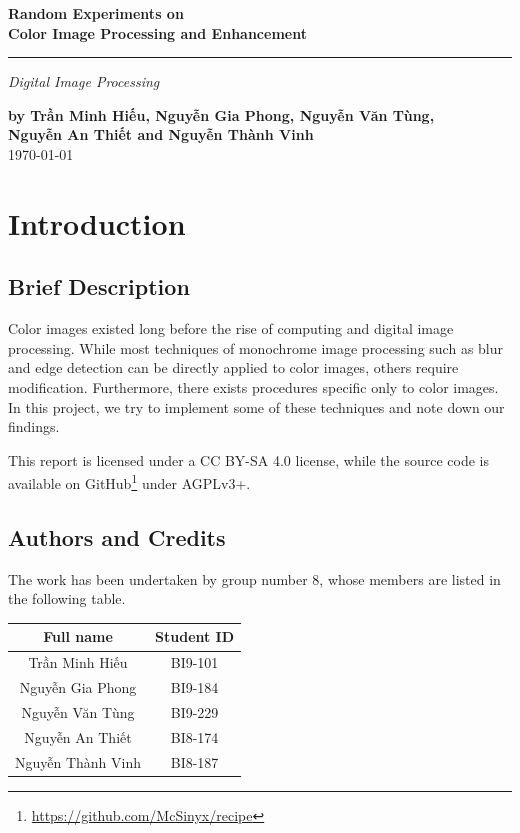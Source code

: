 \documentclass[a4paper,12pt]{article}
\begin{document}
\setcounter{page}{0}
\thispagestyle{empty}
\begin{flushright}
  \setlength{\baselineskip}{1.4\baselineskip}
\textbf{\Large Random Experiments on\\
        Color Image Processing and Enhancement}
  \noindent\rule{\textwidth}{3pt}
  \emph{\Large Digital Image Processing}

  \textbf{by Trần Minh Hiếu, Nguyễn Gia Phong, Nguyễn Văn Tùng,\\
          Nguyễn An Thiết and Nguyễn Thành Vinh\\}
  \today
\end{flushright}
\pagebreak

\tableofcontents
\pagebreak

\section{Introduction}
\subsection{Brief Description}
Color images existed long before the rise of computing and digital image
processing.  While most techniques of monochrome image processing such as
blur and edge detection can be directly applied to color images, others
require modification.  Furthermore, there exists procedures specific only
to color images.  In this project, we try to implement some of these
techniques and note down our findings.

This report is licensed under a CC BY-SA 4.0 license, while the source code
is available on GitHub\footnote{\url{https://github.com/McSinyx/recipe}}
under AGPLv3+.

\subsection{Authors and Credits}
The work has been undertaken by group number 8, whose members are listed
in the following table.
\begin{center}
  \begin{tabular}{c c}
    \toprule
    Full name & Student ID\\
    \midrule
    Trần Minh Hiếu & BI9-101\\
    Nguyễn Gia Phong & BI9-184\\
    Nguyễn Văn Tùng & BI9-229\\
    Nguyễn An Thiết & BI8-174\\
    Nguyễn Thành Vinh & BI8-187\\
    \bottomrule
  \end{tabular}
\end{center}
\end{document}
